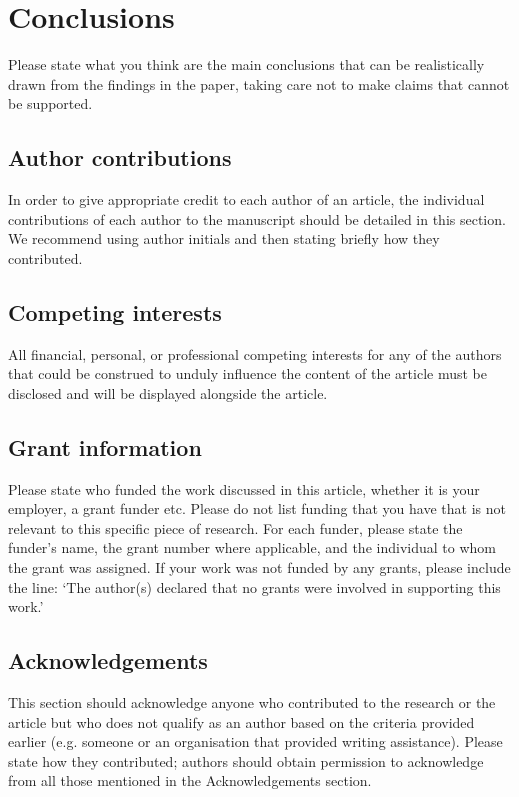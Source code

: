 \documentclass[10pt,a4paper,twocolumn]{article}
\begin{document}
\section*{Conclusions}
Please state what you think are the main conclusions that can be realistically drawn from the findings in the paper, taking care not to make claims that cannot be supported.



\subsection*{Author contributions}
In order to give appropriate credit to each author of an article, the individual
contributions of each author to the manuscript should be detailed in this section. We
recommend using author initials and then stating briefly how they contributed.

\subsection*{Competing interests}
All financial, personal, or professional competing interests for any of the authors that
could be construed to unduly influence the content of the article must be disclosed and
will be displayed alongside the article.

\subsection*{Grant information}
Please state who funded the work discussed in this article, whether it is your employer,
a grant funder etc. Please do not list funding that you have that is not relevant to this
specific piece of research. For each funder, please state the funder’s name, the grant
number where applicable, and the individual to whom the grant was assigned.
If your work was not funded by any grants, please include the line: ‘The author(s)
declared that no grants were involved in supporting this work.’

\subsection*{Acknowledgements}
This section should acknowledge anyone who contributed to the research or the
article but who does not qualify as an author based on the criteria provided earlier
(e.g. someone or an organisation that provided writing assistance). Please state how
they contributed; authors should obtain permission to acknowledge from all those
mentioned in the Acknowledgements section.
\end{document}
